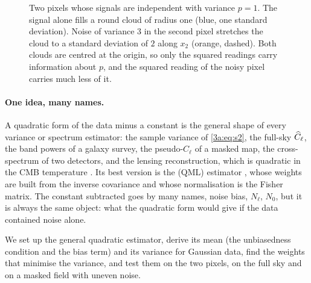 \begin{figure}[htbp]
\centering
{}
\caption{Two pixels whose signals are independent with variance $p=1$. The
signal alone fills a round cloud of radius one (blue, one standard
deviation). Noise of variance $3$ in the second pixel stretches the cloud to
a standard deviation of $2$ along $x_2$ (orange, dashed). Both clouds are
centred at the origin, so only the squared readings carry information about
$p$, and the squared reading of the noisy pixel carries much less of it.}
\label{T5a:fig:cloud}
\end{figure}

\paragraph{One idea, many names.}
A quadratic form of the data minus a constant is the general shape of every
variance or spectrum estimator: the sample variance of \cref{3a:eq:s2}, the
full-sky $\widehat{C}_\ell$, the band powers of a galaxy survey, the pseudo-$C_\ell$ of
a masked map, the cross-spectrum of two detectors, and the lensing
reconstruction, which is quadratic in the CMB temperature
\cite{HuOkamoto2002}. Its best version is the  (QML) estimator \cite{Tegmark1997QML}, whose weights are
built from the inverse covariance and whose normalisation is the Fisher
matrix. The constant subtracted goes by many names, noise bias,
$N_\ell$, $N_0$, but it is always the same object: what the quadratic form
would give if the data contained noise alone.

We set up the general quadratic estimator, derive its mean (the
unbiasedness condition and the bias term) and its variance for Gaussian
data, find the weights that minimise the variance, and test them on the two
pixels, on the full sky and on a masked field with uneven noise.

